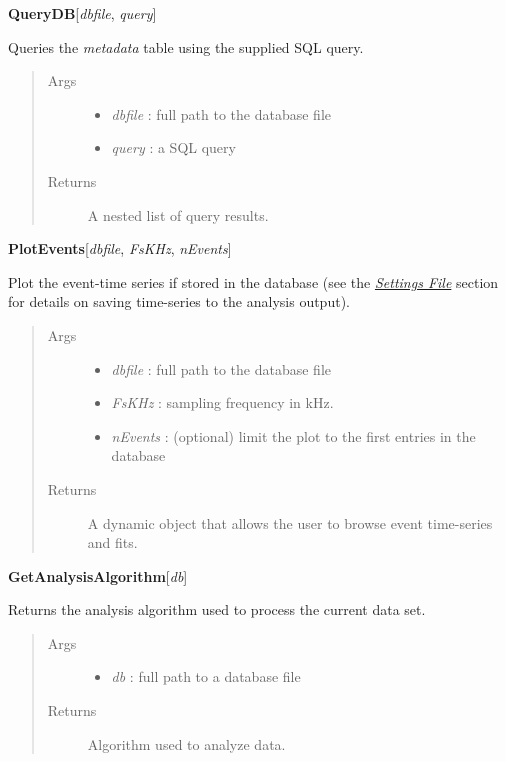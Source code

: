 \documentclass[letterpaper,10pt,english]{sphinxmanual}
\begin{document}
\textbf{QueryDB}{[}\emph{dbfile}, \emph{query}{]}

Queries the \emph{metadata} table using the supplied SQL query.
\begin{quote}\begin{description}
\item[{Args}] \leavevmode\begin{itemize}
\item {} 
\emph{dbfile} :    full path to the database file

\item {} 
\emph{query}  :    a SQL query

\end{itemize}

\item[{Returns}] \leavevmode
A nested list of query results.

\end{description}\end{quote}

\textbf{PlotEvents}{[}\emph{dbfile}, \emph{FsKHz}, \emph{nEvents}{]}

Plot the event-time series if stored in the database (see the {\hyperref[doc/settingsFile:settings\string-page]{\emph{Settings File}}} section for details on saving time-series to the analysis output).
\begin{quote}\begin{description}
\item[{Args}] \leavevmode\begin{itemize}
\item {} 
\emph{dbfile} :    full path to the database file

\item {} 
\emph{FsKHz}  :    sampling frequency in kHz.

\item {} 
\emph{nEvents} :   (optional) limit the plot to the first  entries in the database

\end{itemize}

\item[{Returns}] \leavevmode
A dynamic object that allows the user to browse event time-series and fits.

\end{description}\end{quote}

\textbf{GetAnalysisAlgorithm}{[}\emph{db}{]}

Returns the analysis algorithm used to process the current data set.
\begin{quote}\begin{description}
\item[{Args}] \leavevmode\begin{itemize}
\item {} 
\emph{db}  :               full path to a database file

\end{itemize}

\item[{Returns}] \leavevmode
Algorithm used to analyze data.

\end{description}\end{quote}
\end{document}
